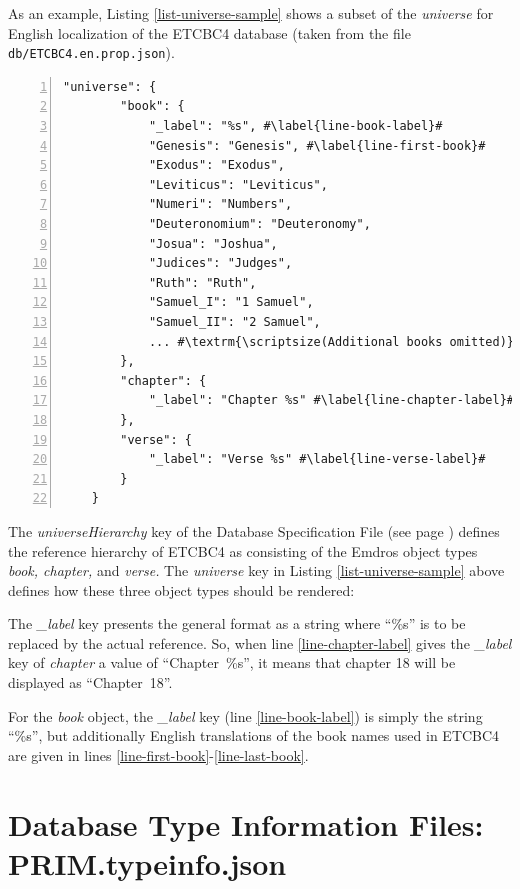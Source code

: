 \documentclass[11pt,oneside,a4paper]{memoir}
\begin{document}
As an example, Listing \ref{list-universe-sample} shows a subset of the \emph{universe} for English
localization of the ETCBC4 database (taken from the file \texttt{db/ETCBC4.en.prop.json}).

\begin{lstlisting}[escapechar=\#,numbers=left,caption=A subset of the universe value,label=list-universe-sample]
    "universe": {
        "book": {
            "_label": "%s", #\label{line-book-label}#
            "Genesis": "Genesis", #\label{line-first-book}#
            "Exodus": "Exodus",
            "Leviticus": "Leviticus",
            "Numeri": "Numbers",
            "Deuteronomium": "Deuteronomy",
            "Josua": "Joshua",
            "Judices": "Judges",
            "Ruth": "Ruth",
            "Samuel_I": "1 Samuel",
            "Samuel_II": "2 Samuel",
            ... #\textrm{\scriptsize(Additional books omitted)}\label{line-last-book}#
        },
        "chapter": {
            "_label": "Chapter %s" #\label{line-chapter-label}#
        },
        "verse": {
            "_label": "Verse %s" #\label{line-verse-label}#
        }
    }
\end{lstlisting}

The \emph{universeHierarchy} key of the Database Specification File (see page
\pageref{universe-hierarchy}) defines the reference hierarchy of ETCBC4 as consisting of the Emdros
object types \emph{book, chapter,} and \emph{verse.} The \emph{universe} key in Listing
\ref{list-universe-sample} above defines how these three object types should be rendered:

The \emph{\_label} key presents the general format as a string where ``\%s'' is to be replaced by
the actual reference. So, when line \ref{line-chapter-label} gives the \emph{\_label} key of
\emph{chapter} a value of ``Chapter~\%s'', it means that chapter 18 will be displayed as
``Chapter~18''.

For the \emph{book} object, the \emph{\_label} key (line \ref{line-book-label}) is simply the string
``\%s'', but additionally English translations of the book names used in ETCBC4 are given in lines
\ref{line-first-book}-\ref{line-last-book}.


\section{Database Type Information Files: PRIM.typeinfo.json}\label{sec-tif}
\end{document}
